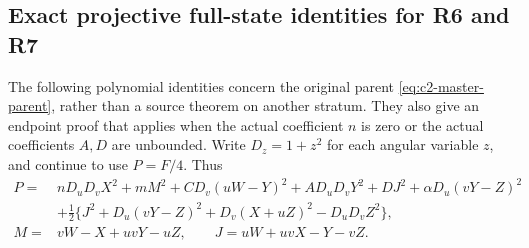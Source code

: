 \subsection{Exact projective full-state identities for R6 and R7}
\label{component:pd5fa361b4623}
\label{pd5fa361b4623:sec:r17-r6-bounded-a}

The following polynomial identities concern the original parent
\eqref{eq:c2-master-parent}, rather than a source theorem on another
stratum. They also give an endpoint proof that applies when the actual
coefficient $n$ is zero or the actual coefficients $A,D$ are unbounded.
Write $D_z=1+z^2$ for each angular variable $z$, and continue to use
$P=F/4$. Thus
\[
\begin{split}
 P={}&nD_uD_vX^2+mM^2+CD_v(uW-Y)^2+AD_uD_vY^2+DJ^2
       +\alpha D_u(vY-Z)^2\\
 &+\tfrac12\{J^2+D_u(vY-Z)^2+D_v(X+uZ)^2-D_uD_vZ^2\},\\
 M={}&vW-X+uvY-uZ,\qquad J=uW+uvX-Y-vZ.
\end{split}
\]

